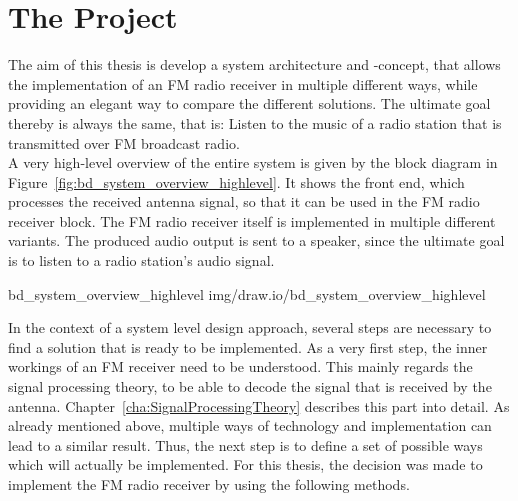 \section{The Project}

The aim of this thesis is develop a system architecture and -concept, that allows the implementation of an FM radio receiver in multiple different ways, while providing an elegant way to compare the different solutions.
The ultimate goal thereby is always the same, that is: Listen to the music of a radio station that is transmitted over FM broadcast radio.\\

\noindent
A very high-level overview of the entire system is given by the block diagram in Figure~\ref{fig:bd_system_overview_highlevel}.
It shows the front end, which processes the received antenna signal, so that it can be used in the FM radio receiver block.
The FM radio receiver itself is implemented in multiple different variants.
The produced audio output is sent to a speaker, since the ultimate goal is to listen to a radio station's audio signal.

 {bd_system_overview_highlevel} {img/draw.io/bd_system_overview_highlevel}

In the context of a system level design approach, several steps are necessary to find a solution that is ready to be implemented.
As a very first step, the inner workings of an FM receiver need to be understood.
This mainly regards the signal processing theory, to be able to decode the signal that is received by the antenna.
Chapter~\ref{cha:SignalProcessingTheory} describes this part into detail.
As already mentioned above, multiple ways of technology and implementation can lead to a similar result.
Thus, the next step is to define a set of possible ways which will actually be implemented.
For this thesis, the decision was made to implement the FM radio receiver by using the following methods.\\


